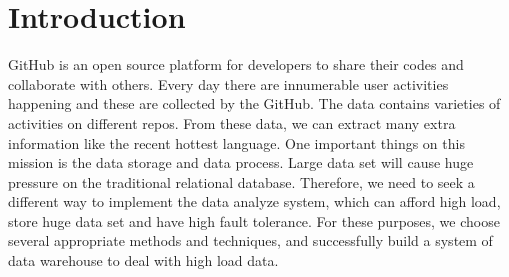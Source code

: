 \section{Introduction}

GitHub is an open source platform for developers to share their codes and collaborate with others. Every day there are innumerable user activities happening and these are collected by the GitHub. The data contains varieties of activities on different repos. From these data, we can extract many extra information like the recent hottest language. One important things on this mission is the data storage and data process. Large data set will cause huge pressure on the traditional relational database. Therefore, we need to seek a different way to implement the data analyze system, which can afford high load, store huge data set and have high fault tolerance. For these purposes, we choose several appropriate methods and techniques, and successfully build a system of data warehouse to deal with high load data. 